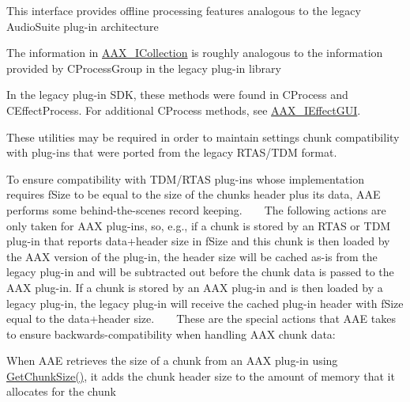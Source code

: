 \begin{DoxyRefList}
\item[\label{a00385__porting_notes000036}%
\hypertarget{a00385__porting_notes000036}{}%
Class \hyperlink{a00066}{A\+A\+X\+\_\+\+I\+A\+C\+F\+Host\+Processor} ]This interface provides offline processing features analogous to the legacy Audio\+Suite plug-\/in architecture 
\item[\label{a00385__porting_notes000037}%
\hypertarget{a00385__porting_notes000037}{}%
Class \hyperlink{a00087}{A\+A\+X\+\_\+\+I\+Collection} ]The information in \hyperlink{a00087}{A\+A\+X\+\_\+\+I\+Collection} is roughly analogous to the information provided by C\+Process\+Group in the legacy plug-\/in library 
\item[\label{a00385__porting_notes000038}%
\hypertarget{a00385__porting_notes000038}{}%
Class \hyperlink{a00099}{A\+A\+X\+\_\+\+I\+Effect\+Parameters} ]In the legacy plug-\/in S\+D\+K, these methods were found in C\+Process and {\ttfamily C\+Effect\+Process}. For additional {\ttfamily C\+Process} methods, see \hyperlink{a00098}{A\+A\+X\+\_\+\+I\+Effect\+G\+U\+I}. 
\item[\label{a00385__porting_notes000060}%
\hypertarget{a00385__porting_notes000060}{}%
File \hyperlink{a00295}{A\+A\+X\+\_\+\+Slider\+Conversions.h} ]These utilities may be required in order to maintain settings chunk compatibility with plug-\/ins that were ported from the legacy R\+T\+A\+S/\+T\+D\+M format. 
\item[\label{a00385__porting_notes000002}%
\hypertarget{a00385__porting_notes000002}{}%
Class \hyperlink{a00126}{A\+A\+X\+\_\+\+S\+Plug\+In\+Chunk\+Header} ]To ensure compatibility with T\+D\+M/\+R\+T\+A\+S plug-\/ins whose implementation requires {\ttfamily f\+Size} to be equal to the size of the chunk\textquotesingle{}s header plus its data, A\+A\+E performs some behind-\/the-\/scenes record keeping. ~\newline
 ~\newline
 The following actions are only taken for A\+A\+X plug-\/ins, so, e.\+g., if a chunk is stored by an R\+T\+A\+S or T\+D\+M plug-\/in that reports data+header size in {\ttfamily f\+Size} and this chunk is then loaded by the A\+A\+X version of the plug-\/in, the header size will be cached as-\/is from the legacy plug-\/in and will be subtracted out before the chunk data is passed to the A\+A\+X plug-\/in. If a chunk is stored by an A\+A\+X plug-\/in and is then loaded by a legacy plug-\/in, the legacy plug-\/in will receive the cached plug-\/in header with {\ttfamily f\+Size} equal to the data+header size. ~\newline
 ~\newline
 These are the special actions that A\+A\+E takes to ensure backwards-\/compatibility when handling A\+A\+X chunk data\+:
\begin{DoxyItemize}
\item When A\+A\+E retrieves the size of a chunk from an A\+A\+X plug-\/in using \hyperlink{a00061_aa986711cd372febcaae803e86ae08f63}{Get\+Chunk\+Size()}, it adds the chunk header size to the amount of memory that it allocates for the chunk ~\newline


\end{DoxyItemize}
\end{DoxyRefList}
